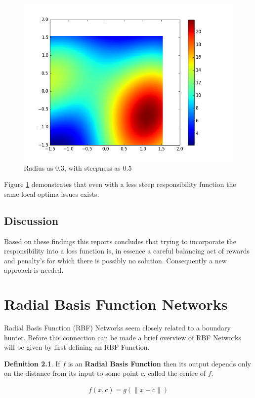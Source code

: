 \documentclass[notitlepage]{report}
\theoremstyle{definition}
\newtheorem{definition}{Definition}[section]
\begin{document}
\begin{figure}[H]
  \centering
  \begin{minipage}[b]{0.8\textwidth}
    \includegraphics[width=\textwidth]{LossPlot-4.png}
    \caption{Radius as 0.3, with steepness as 0.5}
    \label{fig:lossplot-04}
  \end{minipage}
  \hfill
\end{figure}


Figure \ref{fig:lossplot-04} demonstrates that even with a less steep responsibility function the same local optima issues exists. 

\section{Discussion}
Based on these findings this reports concludes that trying to incorporate the responsibility into a loss function is, in essence a careful balancing act of rewards and penalty's for which there is possibly no solution. Consequently a new approach is needed.

\chapter{Radial Basis Function Networks}
Radial Basis Function (RBF) Networks seem closely related to a boundary hunter. Before this connection can be made a brief overview of RBF Networks will be given by first defining an RBF Function.\\

\theoremstyle{definition}
\begin{definition}
	If $f$ is an \textbf{Radial Basis Function} then its output depends only on the distance from its input to some point $c$, called the centre of $f$.
	
	\begin{align}
		f(x, c) = g(\lVert x - c \lVert)
	\end{align}
\end{definition}
\end{document}

